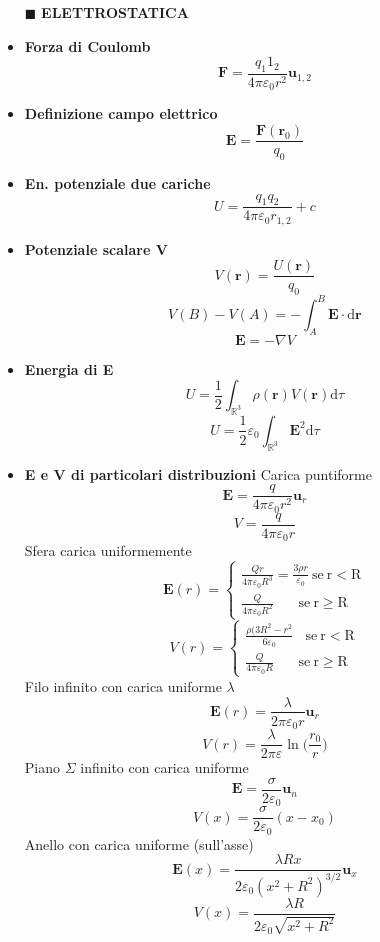 \documentclass{book}
\newcommand{\g}{\textbf}
\newcommand{\h}{\mathbf}
\newcommand{\e}{\begin{equation}}
\newcommand{\ex}{\end{equation} }
\renewcommand{\it}{\item[$\cdot$]}
\begin{document}
\begin{multicols}{4}
\begin{itemize}
\item [$\blacksquare$] \g{ELETTROSTATICA}
    \it \g{Forza di Coulomb}
        \e{\h{F}=\frac{q_1 1_2}{4\pi\varepsilon_0 r^2}\h{u}_{1,2}} \ex
    \it \g{Definizione campo elettrico}
        \e{\h{E}=\frac{\h{F}(\h{r}_0)}{q_0}} \ex
    \it \g{En. potenziale due cariche}
        \e{U=\frac{q_1q_2}{4\pi\varepsilon_0r_{1,2}}+c} \ex
    \it \g{Potenziale scalare V}
        \e{V(\h{r})=\frac{U(\h{r})}{q_0}} \ex
        \e{V(B)-V(A)=-\int_A^B\h{E}\cdot \mathrm{d} \h{r}} \ex
        \e{\h{E}=-\nabla V} \ex
    \it \g{Energia di E}
        \e{U=\frac{1}{2} \int_{\mathbb{R}^3} \rho(\h{r}) V(\h{r}) \mathrm{d}\tau} \ex
        \e{U=\frac{1}{2}\varepsilon_0\int_{\mathbb{R}^3}\h{E}^2 \mathrm{d}\tau} \ex
    \it \g{E e V di particolari distribuzioni}
    Carica puntiforme 
        \e{\h{E}=\frac{q}{4\pi\varepsilon_0 r^2}\h{u}_{r}} \ex
        \e{V=\frac{q}{4\pi\varepsilon_0 r}} \ex
    Sfera carica uniformemente
        \e{ \h{E}(r)=\begin{cases} 
        \frac{Qr}{4\pi\varepsilon_0 R^3}=\frac{3 \rho r}{\varepsilon_0} \mathrm{\ se\ r<R}\\
        \frac{Q}{4\pi\varepsilon_0 R^2} \ \ \ \ \ \ \ \mathrm{\ se\ r\geq R}\end{cases} } \ex
        \e{ V(r)=\begin{cases} 
        \frac{\rho (3R^2-r^2}{6\varepsilon_0 } \ \ \  \mathrm{\ se\ r<R}\\
        \frac{Q}{4\pi\varepsilon_0 R} \ \ \ \ \ \ \ \mathrm{\ se\ r\geq R}\end{cases} } \ex
    Filo infinito con carica uniforme $\lambda$
        \e{\h{E}(r)=\frac{\lambda}{2\pi\varepsilon_0 r} \h{u}_r} \ex
        \e{V(r)=\frac{\lambda}{2\pi\varepsilon} \ln \biggl(\frac{r_0}{r}\biggr)} \ex
    Piano $\Sigma$ infinito con carica uniforme
        \e{\h{E}=\frac{\sigma}{2\varepsilon_0} \h{u}_n } \ex
        \e{V(x)=\frac{\sigma}{2\varepsilon_0}(x-x_0)} \ex   
    Anello con carica uniforme (sull’asse)
        \e{\h{E}(x)=\frac{\lambda R x}{2\varepsilon_0(x^2+R^2)^{3/2}} \h{u}_x} \ex
        \e{V(x)=\frac{\lambda R}{2\varepsilon_0\sqrt{x^2+R^2}}} \ex


\end{itemize}
\end{multicols}
\end{document}
